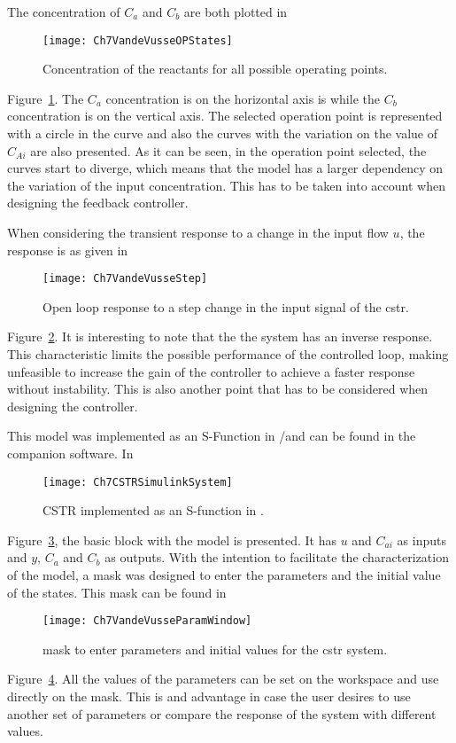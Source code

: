 The concentration of $C_a$ and $C_b$ are both plotted in %
\begin{figure}
	\centering
	\texttt{[image: Ch7VandeVusseOPStates]}
	\caption{Concentration of the reactants for all possible operating points.}
	\label{fig:Ch7VandeVusseOPStates}
\end{figure}
%
Figure~\ref{fig:Ch7VandeVusseOPStates}. The $C_a$ concentration is on the horizontal axis is while the $C_b$ concentration is on the vertical axis. The selected operation point is represented with a circle in the curve and also the curves with the variation on the value of $C_{Ai}$ are also presented. As it can be seen, in the operation point selected, the curves start to diverge, which means that the model has a larger dependency on the variation of the input concentration. This has to be taken into account when designing the feedback controller.

When considering the transient response to a change in the input flow $u$, the response is as given in %
\begin{figure}
	\centering
	\texttt{[image: Ch7VandeVusseStep]}
	\caption{Open loop response to a step change in the input signal of the \gls{cstr}.}
	\label{fig:Ch7VandeVusseStep}
\end{figure}
%
Figure~\ref{fig:Ch7VandeVusseStep}. It is interesting to note that the the system has an inverse response. This characteristic limits the possible performance of the controlled loop, making unfeasible to increase the gain of the controller to achieve a faster response without instability. This is also another point that has to be considered when designing the controller.

This model was implemented as an S-Function in \matlab/\simulink and can be found in the companion software. In %
\begin{figure}[tb]
	\centering
	\texttt{[image: Ch7CSTRSimulinkSystem]}
	\caption{CSTR implemented as an S-function in \simulink.}
	\label{fig:Ch7CSTRSimulinkSystem}
\end{figure}
%
Figure~\ref{fig:Ch7CSTRSimulinkSystem}, the basic block with the model is presented. It has $u$ and $C_{ai}$ as inputs and $y$, $C_a$ and $C_b$ as outputs. With the intention to facilitate the characterization of the model, a mask was designed to enter the parameters and the initial value of the states. This mask can be found in %
\begin{figure}[tb]
	\centering
	\texttt{[image: Ch7VandeVusseParamWindow]}
	\caption{\simulink mask to enter parameters and initial values for the \gls{cstr} system.}
	\label{fig:Ch7VandeVusseParamWindow}
\end{figure}  
Figure~\ref{fig:Ch7VandeVusseParamWindow}. All the values of the parameters can be set on the \matlab workspace and use directly on the mask. This is and advantage in case the user desires to use another set of parameters or compare the response of the system with different values.

